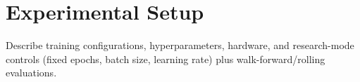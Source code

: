 \chapter{Experimental Setup}

Describe training configurations, hyperparameters, hardware, and research-mode controls (fixed epochs, batch size, learning rate) plus walk-forward/rolling evaluations.
